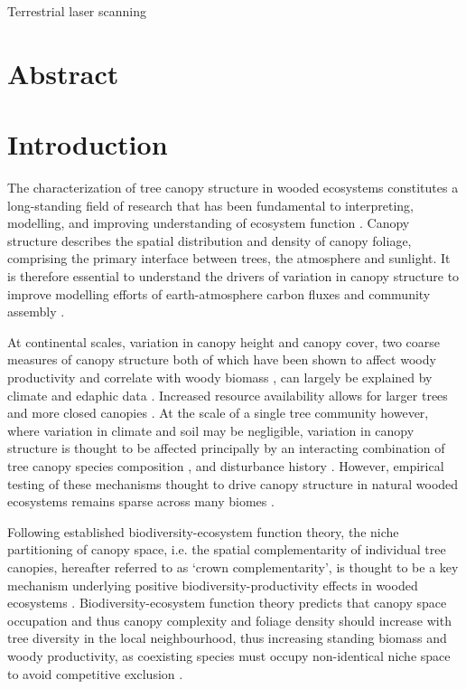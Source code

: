 \documentclass[11pt,a4paper]{article}
\newcommand{\titletext}{Terrestrial laser scanning}
\begin{document}
{\Large{\titletext{}}}

\linenumbers

\section*{Abstract}

\section{Introduction}

The characterization of tree canopy structure in wooded ecosystems constitutes a long-standing field of research that has been fundamental to interpreting, modelling, and improving understanding of ecosystem function \citep{Watt1947, Whittaker1969, Horn1971, Maarel1996}. Canopy structure describes the spatial distribution and density of canopy foliage, comprising the primary interface between trees, the atmosphere and sunlight. It is therefore essential to understand the drivers of variation in canopy structure to improve modelling efforts of earth-atmosphere carbon fluxes and community assembly \citep{}. 

At continental scales, variation in canopy height and canopy cover, two coarse measures of canopy structure both of which have been shown to affect woody productivity and correlate with woody biomass \citep{}, can largely be explained by climate and edaphic data \citep{SOME-GEDI}. Increased resource availability allows for larger trees and more closed canopies \citep{}. At the scale of a single tree community however, where variation in climate and soil may be negligible, variation in canopy structure is thought to be affected principally by an interacting combination of tree canopy species composition \citep{}, and disturbance history \citep{}. However, empirical testing of these mechanisms thought to drive canopy structure in natural wooded ecosystems remains sparse across many biomes \citep{}.

Following established biodiversity-ecosystem function theory, the niche partitioning of canopy space, i.e. the spatial complementarity of individual tree canopies, hereafter referred to as `crown complementarity', is thought to be a key mechanism underlying positive biodiversity-productivity effects in wooded ecosystems \citep{Pretzsch2014, Barry2019}. Biodiversity-ecosystem function theory predicts that canopy space occupation and thus canopy complexity and foliage density should increase with tree diversity in the local neighbourhood, thus increasing standing biomass and woody productivity, as coexisting species must occupy non-identical niche space to avoid competitive exclusion \citep{Gadow1993}. 
\end{document}
